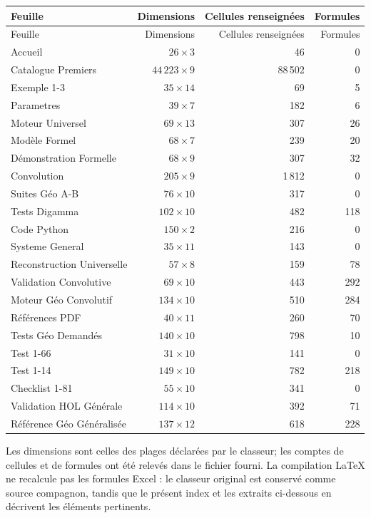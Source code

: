 \documentclass[11pt,a4paper]{article}
\begin{document}
\small
\begin{longtable}{@{}p{6.5cm}r r r@{}}
\toprule
\rowcolor{spectralgris}
Feuille & Dimensions & Cellules renseignées & Formules \\
\midrule
\endfirsthead
\toprule
\rowcolor{spectralgris}
Feuille & Dimensions & Cellules renseignées & Formules \\
\midrule
\endhead
\bottomrule
\endfoot
Accueil & $26\times3$ & 46 & 0 \\
Catalogue Premiers & $44\,223\times9$ & 88\,502 & 0 \\
Exemple 1-3 & $35\times14$ & 69 & 5 \\
Parametres & $39\times7$ & 182 & 6 \\
Moteur Universel & $69\times13$ & 307 & 26 \\
Modèle Formel & $68\times7$ & 239 & 20 \\
Démonstration Formelle & $68\times9$ & 307 & 32 \\
Convolution & $205\times9$ & 1\,812 & 0 \\
Suites Géo A-B & $76\times10$ & 317 & 0 \\
Tests Digamma & $102\times10$ & 482 & 118 \\
Code Python & $150\times2$ & 216 & 0 \\
Systeme General & $35\times11$ & 143 & 0 \\
Reconstruction Universelle & $57\times8$ & 159 & 78 \\
Validation Convolutive & $69\times10$ & 443 & 292 \\
Moteur Géo Convolutif & $134\times10$ & 510 & 284 \\
Références PDF & $40\times11$ & 260 & 70 \\
Tests Géo Demandés & $140\times10$ & 798 & 10 \\
Test 1-66 & $31\times10$ & 141 & 0 \\
Test 1-14 & $149\times10$ & 782 & 218 \\
Checklist 1-81 & $55\times10$ & 341 & 0 \\
Validation HOL Générale & $114\times10$ & 392 & 71 \\
Référence Géo Généralisée & $137\times12$ & 618 & 228 \\
\end{longtable}
\normalsize

Les dimensions sont celles des plages déclarées par le classeur; les comptes
de cellules et de formules ont été relevés dans le fichier fourni. La
compilation LaTeX ne recalcule pas les formules Excel : le classeur original
est conservé comme source compagnon, tandis que le présent index et les
extraits ci-dessous en décrivent les éléments pertinents.
\end{document}
